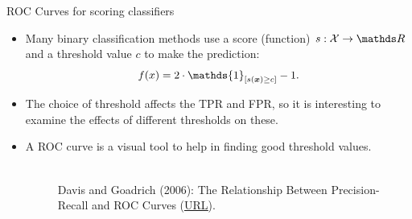 	\begin{frame}{ROC Curves for scoring classifiers}
		\small
		\begin{itemize}
			\item 	Many binary classification methods use a score (function) $s:\Xspace \to \R$ and a threshold value $c$ to make the prediction:
			$$\fx = 2 \cdot \mathds{1}_{[ s(\xv) \ge c]} -1.$$
			\item The choice of threshold affects the TPR and FPR, so it is interesting to examine the effects of different thresholds on these.
			
			\item A ROC curve is a visual tool to help in finding good threshold values.
%			
			
			\begin{figure}
				\centering
				\tiny
				\\Davis and Goadrich (2006): The Relationship Between Precision-Recall and
				ROC Curves (\href{https://www.biostat.wisc.edu/~page/rocpr.pdf}
				{\underline{URL}}).
			\end{figure}
		\end{itemize}

	\end{frame}

